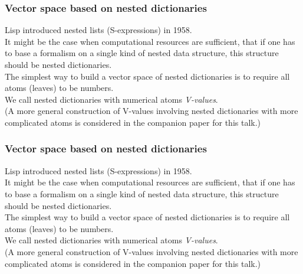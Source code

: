 \documentclass{beamer}
\newcommand{\msgray}[1]{{\color{mygray} #1}}
\begin{document}
\begin{frame}

  \frametitle{Vector space based on nested dictionaries}

Lisp introduced nested lists (S-expressions) in 1958.\\[2ex]

It might be the case when computational resources are sufficient, 
that if one has to base a formalism on a single kind of nested data structure, this structure should be nested dictionaries.\\[2ex]

The simplest way to build a vector space of nested dictionaries is to require
all atoms (leaves) to be numbers.\\[2ex]

\msgray{We call nested dictionaries with numerical atoms {\em V-values}.\\[2ex]

(A more general construction of V-values involving nested dictionaries with more complicated atoms is considered in the companion paper for this talk.)}

\end{frame}


\begin{frame}

  \frametitle{Vector space based on nested dictionaries}

Lisp introduced nested lists (S-expressions) in 1958.\\[2ex]

It might be the case when computational resources are sufficient, 
that if one has to base a formalism on a single kind of nested data structure, this structure should be nested dictionaries.\\[2ex]

The simplest way to build a vector space of nested dictionaries is to require
all atoms (leaves) to be numbers.\\[2ex]

We call nested dictionaries with numerical atoms {\em V-values}.\\[2ex]

\msgray{(A more general construction of V-values involving nested dictionaries with more complicated atoms is considered in the companion paper for this talk.)}

\end{frame}
\end{document}
